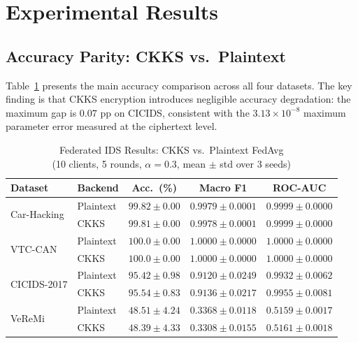 \documentclass[conference]{IEEEtran}
\begin{document}
\section{Experimental Results}
\label{sec:results}

\subsection{Accuracy Parity: CKKS vs.\ Plaintext}

Table~\ref{tab:main} presents the main accuracy comparison across all four
datasets. The key finding is that CKKS encryption introduces negligible
accuracy degradation: the maximum gap is $0.07$ pp on CICIDS, consistent
with the $3.13 \times 10^{-8}$ maximum parameter error measured at the
ciphertext level.

\begin{table}[!t]
\centering
\caption{Federated IDS Results: CKKS vs.\ Plaintext FedAvg\\
(10 clients, 5 rounds, $\alpha{=}0.3$, mean $\pm$ std over 3 seeds)}
\label{tab:main}
\setlength{\tabcolsep}{3pt}
\begin{tabular}{@{}llccc@{}}
\toprule
\textbf{Dataset} & \textbf{Backend} &
  \textbf{Acc.\ (\%)} & \textbf{Macro F1} & \textbf{ROC-AUC} \\
\midrule
\multirow{2}{*}{Car-Hacking}
  & Plaintext & $99.82 \pm 0.00$ & $0.9979 \pm 0.0001$ & $0.9999 \pm 0.0000$ \\
  & CKKS      & $99.81 \pm 0.00$ & $0.9978 \pm 0.0001$ & $0.9999 \pm 0.0000$ \\
\midrule
\multirow{2}{*}{VTC-CAN}
  & Plaintext & $100.0 \pm 0.00$ & $1.0000 \pm 0.0000$ & $1.0000 \pm 0.0000$ \\
  & CKKS      & $100.0 \pm 0.00$ & $1.0000 \pm 0.0000$ & $1.0000 \pm 0.0000$ \\
\midrule
\multirow{2}{*}{CICIDS-2017}
  & Plaintext & $95.42 \pm 0.98$ & $0.9120 \pm 0.0249$ & $0.9932 \pm 0.0062$ \\
  & CKKS      & $95.54 \pm 0.83$ & $0.9136 \pm 0.0217$ & $0.9955 \pm 0.0081$ \\
\midrule
\multirow{2}{*}{VeReMi}
  & Plaintext & $48.51 \pm 4.24$ & $0.3368 \pm 0.0118$ & $0.5159 \pm 0.0017$ \\
  & CKKS      & $48.39 \pm 4.33$ & $0.3308 \pm 0.0155$ & $0.5161 \pm 0.0018$ \\
\bottomrule
\end{tabular}
\end{table}
\end{document}
